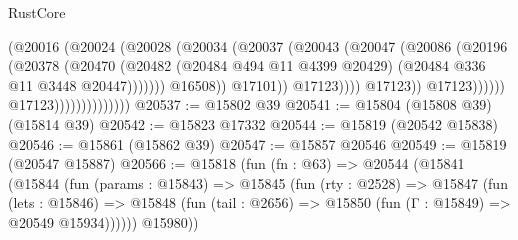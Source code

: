 \begin{lexlean}{RustCore}
\begin{coremodule}
                                                    (@20016
                                                      (@20024
                                                        (@20028
                                                          (@20034
                                                            (@20037
                                                              (@20043
                                                                (@20047
                                                                  (@20086
                                                                    (@20196
                                                                      (@20378
                                                                        (@20470
                                                                          (@20482
                                                                            (@20484
                                                                              @494
                                                                              @11
                                                                              @4399
                                                                              @20429)
                                                                            (@20484
                                                                              @336
                                                                              @11
                                                                              @3448
                                                                              @20447)))))))
                                                                @16508))
                                                            @17101))
                                                        @17123))))
                                                @17123))
                                            @17123))))))
                                @17123))))))))))))))
@20537 := @15802 @39
@20541 := @15804 (@15808 @39) (@15814 @39)
@20542 := @15823 @17332
@20544 := @15819 (@20542 @15838)
@20546 := @15861 (@15862 @39)
@20547 := @15857 @20546
@20549 := @15819 (@20547 @15887)
@20566 := @15818
    (fun (fn : @63) =>
    @20544
      (@15841
        (@15844
          (fun (params : @15843) =>
          @15845
            (fun (rty : @2528) =>
            @15847
              (fun (lets : @15846) =>
              @15848 (fun (tail : @2656) => @15850 (fun (Γ : @15849) => @20549 @15934))))))
        @15980))

\end{coremodule}
\end{lexlean}

